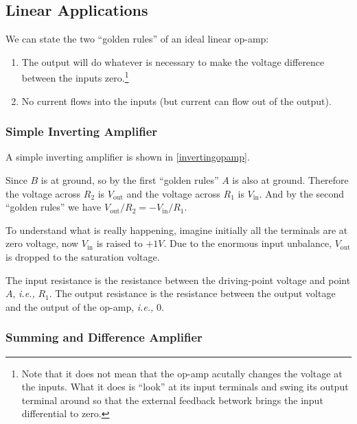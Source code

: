 \documentclass[english,a4paper,12pt]{report}
\begin{document}

\subsection{Linear Applications}

We can state the two ``golden rules'' of an ideal linear op-amp:

\begin{enumerate}
    \item The output will do whatever is necessary to make the voltage difference between the inputs zero.\footnote{Note that it does not mean that the op-amp acutally changes the voltage at the inputs. What it does is ``look'' at its input terminals and swing its output terminal around so that the external feedback betwork brings the input differential to zero.}
    \item No current flows into the inputs (but current can flow out of the output).
\end{enumerate}

\subsubsection{Simple Inverting Amplifier}

A simple inverting amplifier is shown in \cref{invertingopamp}.


Since \(B\) is at ground, so by the first ``golden rules'' \(A\) is also at ground. Therefore the voltage across \(R_2 \) is \(V_{\text{out}} \) and the voltage across \(R_1 \) is \(V_{\text{in}} \). And by the second ``golden rules'' we have \(V_{\text{out} } /R_2 = - V_{\text{in} }/ R_1  \). 

To understand what is really happening, imagine initially all the terminals are at zero voltage, now \(V_{\text{in}} \) is raised to \(+1V\). Due to the enormous input unbalance, \(V_{\text{out}} \) is dropped to the saturation voltage.

The input resistance is the resistance between the driving-point voltage and point \(A\), \textit{i.e.,} \(R_1 \). The output resistance is the resistance between the output voltage and the output of the op-amp, \textit{i.e.,} 0.

\subsubsection{Summing and Difference Amplifier}
\end{document}

